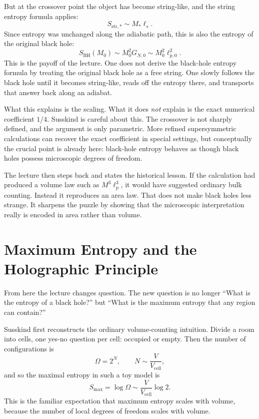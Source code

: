 But at the crossover point the object has become string-like, and the string entropy formula applies:
\begin{equation}
S_{\mathrm{str},\ast} \sim M_\ast \ell_s.
\end{equation}
Since entropy was unchanged along the adiabatic path, this is also the entropy of the original black hole:
\begin{equation}
S_{\mathrm{BH}}(M_0) \sim M_0^2 G_{N,0} \sim M_0^2 \ell_{p,0}^2.
\end{equation}
This is the payoff of the lecture. One does not derive the black-hole entropy formula by treating the original black hole as a free string. One slowly follows the black hole until it becomes string-like, reads off the entropy there, and transports that answer back along an adiabat.

What this explains is the scaling. What it does \emph{not} explain is the exact numerical coefficient \(1/4\). Susskind is careful about this. The crossover is not sharply defined, and the argument is only parametric. More refined supersymmetric calculations can recover the exact coefficient in special settings, but conceptually the crucial point is already here: black-hole entropy behaves as though black holes possess microscopic degrees of freedom.

The lecture then steps back and states the historical lesson. If the calculation had produced a volume law such as \(M^3\ell_p^3\), it would have suggested ordinary bulk counting. Instead it reproduces an area law. That does not make black holes less strange. It sharpens the puzzle by showing that the microscopic interpretation really is encoded in area rather than volume.

\section{Maximum Entropy and the Holographic Principle}

From here the lecture changes question. The new question is no longer ``What is the entropy of a black hole?'' but ``What is the maximum entropy that any region can contain?''

Susskind first reconstructs the ordinary volume-counting intuition. Divide a room into cells, one yes-no question per cell: occupied or empty. Then the number of configurations is
\begin{equation}
\Omega = 2^N,
\qquad
N \sim \frac{V}{V_{\mathrm{cell}}},
\end{equation}
and so the maximal entropy in such a toy model is
\begin{equation}
S_{\max}=\log \Omega \sim \frac{V}{V_{\mathrm{cell}}}\log 2.
\end{equation}
This is the familiar expectation that maximum entropy scales with volume, because the number of local degrees of freedom scales with volume.

